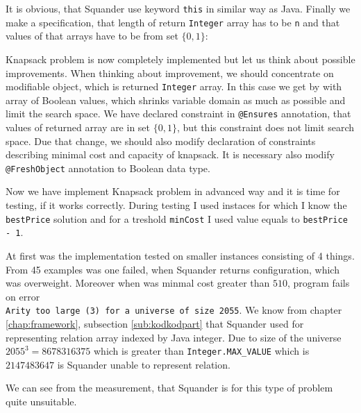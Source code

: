 \documentclass[11pt,twoside,a4paper]{book}
\begin{document}


It is obvious, that Squander use keyword \verb|this| in similar way as Java.
Finally we make a specification, that length of return \verb|Integer| array has
to be \verb|n| and that values of that arrays have to be from set $\{0, 1\}$:



Knapsack problem is now completely implemented but let us think about possible
improvements. When thinking about improvement, we should concentrate on
modifiable object, which is returned \verb|Integer| array. In this case we get
by with array of Boolean values, which shrinks variable domain as much as possible
and limit the search space. We have declared constraint in \verb|@Ensures|
annotation, that values of returned array are in set $\{0, 1\}$, but this
constraint does not limit search space. Due that change, we should also modify
declaration of constraints describing minimal cost and capacity of knapsack. It
is necessary also modify \verb|@FreshObject| annotation to Boolean data type.



Now we have implement Knapsack problem in advanced way and it is time for
testing, if it works correctly. During testing I used instaces for which I
know the \verb|bestPrice| solution and for a treshold \verb|minCost| I used
value equals to \verb|bestPrice - 1|.

At first was the implementation tested on smaller instances consisting of 4
things. From 45 examples was one failed, when Squander returns configuration,
which was overweight. Moreover when was minmal cost greater than $510$, program
fails on error\\ \verb|Arity too large (3) for a universe of size 2055|. We know
from chapter \ref{chap:framework}, subsection \ref{sub:kodkodpart} that Squander
used for representing relation array indexed by Java integer. Due to size of
the universe $2055^3 = 8678316375$ which is greater than
\verb|Integer.MAX_VALUE| which is $2147483647$ is Squander unable to represent relation.

We can see from the measurement, that Squander is for this type of problem quite
unsuitable.
\end{document}
